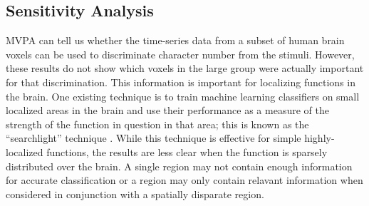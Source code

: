 \documentclass[5p,authoryear]{elsarticle}
\begin{document}
\subsection{Sensitivity Analysis}
MVPA can tell us whether the time-series data from a subset of human brain voxels can be used to discriminate character number from the stimuli. 
However, these results do not show which voxels in the large group were actually important for that discrimination.
This information is important for localizing functions in the brain.
One existing technique is to train machine learning classifiers on small localized areas in the brain and use their performance as a measure of the strength of the function in question in that area; this is known as the ``searchlight'' technique \citep{Kriegeskorte2006}.
While this technique is effective for simple highly-localized functions, the results are less clear when the function is sparsely distributed over the brain.
A single region may not contain enough information for accurate classification or a region may only contain relavant information when considered in conjunction with a spatially disparate region.

\end{document}
